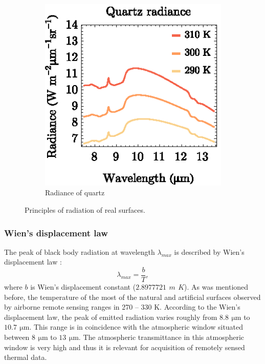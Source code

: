 \begin{figure}[htb]
\begin{subfigure}[t]{.3\linewidth}
	\end{subfigure}
	\hspace{1em}
	\begin{subfigure}[t]{.3\linewidth}
		\centering
		\includegraphics[scale=1]{pics/Chapter_01/QuartzRadiance.eps}
		\vspace{-0.1cm}
		\caption{Radiance of quartz}
		\label{fig:QuartzRadiance}
	\end{subfigure}
	\vspace{1.5 em}
	\caption{Principles of radiation of real surfaces.}
\end{figure}


\subsubsection*{Wien's displacement law}
The peak of black body radiation at wavelength $\lambda_{max}$ is described by Wien's displacement law \cite{H11}:
$$ \lambda_{max} = \frac{b}{T},$$
where $b$ is Wien's displacement constant ($2.8977721\,\SI{}{m}\,\SI{}{K}$). As was mentioned before, the temperature of the most of the natural and artificial surfaces observed by airborne remote sensing ranges in 270 – 330 K. According to the Wien's displacement law, the peak of emitted radiation varies roughly from $8.8\,\SI{}{\micro\meter}$ to $10.7\,\SI{}{\micro\meter}$. This range is in coincidence with the atmospheric window situated between $8\,\SI{}{\micro\meter}$ to $13\,\SI{}{\micro\meter}$. The atmospheric transmittance in this atmospheric window is very high and thus it is relevant for acquisition of remotely sensed thermal data.

